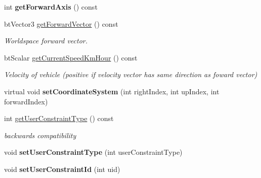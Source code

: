 \begin{DoxyCompactItemize}
\item 
\mbox{\label{classbtRaycastVehicle_ab78aa61c3533ef0369ed6a8304580334}} 
int {\bfseries get\+Forward\+Axis} () const
\item 
\mbox{\label{classbtRaycastVehicle_a24312c6dce6a155b14147170c0eef263}} 
bt\+Vector3 \hyperlink{classbtRaycastVehicle_a24312c6dce6a155b14147170c0eef263}{get\+Forward\+Vector} () const
\begin{DoxyCompactList}\small\item\em Worldspace forward vector. \end{DoxyCompactList}\item 
\mbox{\label{classbtRaycastVehicle_aee54020262c0ff82165ea0e542319906}} 
bt\+Scalar \hyperlink{classbtRaycastVehicle_aee54020262c0ff82165ea0e542319906}{get\+Current\+Speed\+Km\+Hour} () const
\begin{DoxyCompactList}\small\item\em Velocity of vehicle (positive if velocity vector has same direction as foward vector) \end{DoxyCompactList}\item 
\mbox{\label{classbtRaycastVehicle_a505882e9089229da3cea15e6af922a0f}} 
virtual void {\bfseries set\+Coordinate\+System} (int right\+Index, int up\+Index, int forward\+Index)
\item 
\mbox{\label{classbtRaycastVehicle_a1965219f0bc5b07eedb0fb745c890db6}} 
int \hyperlink{classbtRaycastVehicle_a1965219f0bc5b07eedb0fb745c890db6}{get\+User\+Constraint\+Type} () const
\begin{DoxyCompactList}\small\item\em backwards compatibility \end{DoxyCompactList}\item 
\mbox{\label{classbtRaycastVehicle_a552a25a880d5fe75c575800156d591fd}} 
void {\bfseries set\+User\+Constraint\+Type} (int user\+Constraint\+Type)
\item 
\mbox{\label{classbtRaycastVehicle_ab894b724e8b19228b7eea8317e0eb43b}} 
void {\bfseries set\+User\+Constraint\+Id} (int uid)

\end{DoxyCompactItemize}
